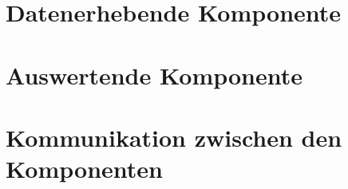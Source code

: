 
\section{Datenerhebende Komponente}
\textit{\lipsum[1]}

\section{Auswertende Komponente}
\textit{\lipsum[1]}

\section{Kommunikation zwischen den Komponenten}
\textit{\lipsum[1]}